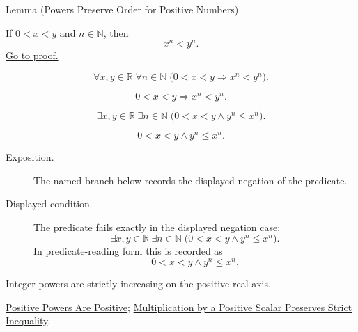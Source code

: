 \begin{lemmabox}{Lemma (Powers Preserve Order for Positive Numbers)}
\begin{lemma}
\label{lem:powers-preserve-order-for-positive-numbers}
If $0<x<y$ and $n\in\mathbb{N}$, then
\[
x^n<y^n.
\]
\hyperref[prf:powers-preserve-order-for-positive-numbers]{Go to proof.}
\end{lemma}
\end{lemmabox}
\begin{remark*}
\[
\forall x,y\in\mathbb{R}\;\forall n\in\mathbb{N}\;
\bigl(0<x<y\Rightarrow x^n<y^n\bigr).
\]
\end{remark*}
\begin{remark*}
\[
0<x<y\Rightarrow x^n<y^n.
\]
\end{remark*}
\begin{remark*}
\[
\exists x,y\in\mathbb{R}\;\exists n\in\mathbb{N}\;
\bigl(0<x<y\land y^n\le x^n\bigr).
\]
\end{remark*}
\begin{remark*}
\[
0<x<y\land y^n\le x^n.
\]
\end{remark*}

\begin{remark*}
\begin{description}
  \item[Exposition.] The named branch below records the displayed negation of the predicate.
  \item[Displayed condition.] The predicate fails exactly in the displayed negation case:
  \[
  \exists x,y\in\mathbb{R}\;\exists n\in\mathbb{N}\;
  \bigl(0<x<y\land y^n\le x^n\bigr).
  \]
  In predicate-reading form this is recorded as
  \[
  0<x<y\land y^n\le x^n.
  \]
\end{description}
\end{remark*}
\begin{remark*}[Interpretation]
Integer powers are strictly increasing on the positive real axis.
\end{remark*}
\begin{dependencies}
\hyperref[lem:positive-powers-are-positive]{Positive Powers Are Positive};
\hyperref[thm:ineq-multiply-positive]{Multiplication by a Positive Scalar Preserves Strict Inequality}.
\end{dependencies}

